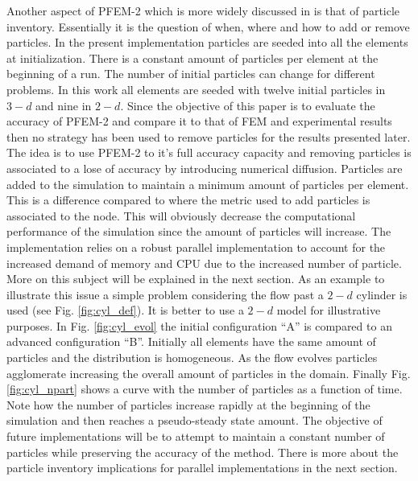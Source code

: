 Another aspect of PFEM-2 which is more widely discussed in \cite{gimenez-difusion} is that of particle inventory. Essentially it is the question of when, where and how to add or remove particles. In the present implementation particles are seeded into all the elements at initialization. There is a constant amount of particles per element at the beginning of a run. The number of initial particles can change for different problems. In this work all elements are seeded with twelve initial particles in $3-d$ and nine in $2-d$. Since the objective of this paper is to evaluate the accuracy of PFEM-2 and compare it to that of FEM and experimental results then no strategy has been used to remove particles for the results presented later. The idea is to use PFEM-2 to it's full accuracy capacity and removing particles is associated to a lose of accuracy by introducing numerical diffusion. Particles are added to the simulation to maintain a minimum amount of particles per element. This is a difference compared to \cite{gimenez-difusion} where the metric used to add particles is associated to the node. This will obviously decrease the computational performance of the simulation since the amount of particles will increase. The implementation relies on a robust parallel implementation to account for the increased demand of memory and CPU due to the increased number of particle. More on this subject will be explained in the next section. As an example to illustrate this issue a simple problem considering the flow past a $2-d$ cylinder is used (see Fig. \ref{fig:cyl_def}). It is better to use a $2-d$ model for illustrative purposes. In Fig. \ref{fig:cyl_evol} the initial configuration ``A'' is compared to an advanced configuration ``B''. Initially all elements have the same amount of particles and the distribution is homogeneous. As the flow evolves particles agglomerate increasing the overall amount of particles in the domain. Finally Fig. \ref{fig:cyl_npart} shows a curve with the number of particles as a function of time. Note how the number of particles increase rapidly at the beginning of the simulation and then reaches a pseudo-steady state amount. The objective of future implementations will be to attempt to maintain a constant number of particles while preserving the accuracy of the method. There is more about the particle inventory implications for parallel implementations in the next section.
%
